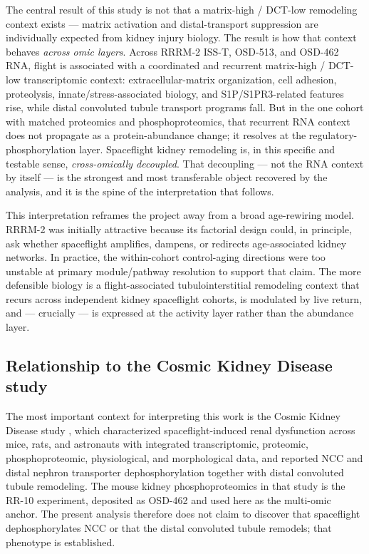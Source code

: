 \documentclass[11pt]{article}
\begin{document}
The central result of this study is not that a matrix-high / DCT-low remodeling context exists --- matrix activation and distal-transport suppression are individually expected from kidney injury biology. The result is how that context behaves \emph{across omic layers}. Across RRRM-2 ISS-T, OSD-513, and OSD-462 RNA, flight is associated with a coordinated and recurrent matrix-high / DCT-low transcriptomic context: extracellular-matrix organization, cell adhesion, proteolysis, innate/stress-associated biology, and S1P/S1PR3-related features rise, while distal convoluted tubule transport programs fall. But in the one cohort with matched proteomics and phosphoproteomics, that recurrent RNA context does not propagate as a protein-abundance change; it resolves at the regulatory-phosphorylation layer. Spaceflight kidney remodeling is, in this specific and testable sense, \emph{cross-omically decoupled}. That decoupling --- not the RNA context by itself --- is the strongest and most transferable object recovered by the analysis, and it is the spine of the interpretation that follows.

This interpretation reframes the project away from a broad age-rewiring model. RRRM-2 was initially attractive because its factorial design could, in principle, ask whether spaceflight amplifies, dampens, or redirects age-associated kidney networks. In practice, the within-cohort control-aging directions were too unstable at primary module/pathway resolution to support that claim. The more defensible biology is a flight-associated tubulointerstitial remodeling context that recurs across independent kidney spaceflight cohorts, is modulated by live return, and --- crucially --- is expressed at the activity layer rather than the abundance layer.

\subsection{Relationship to the Cosmic Kidney Disease study}

The most important context for interpreting this work is the Cosmic Kidney Disease study \citep{siew2024cosmic}, which characterized spaceflight-induced renal dysfunction across mice, rats, and astronauts with integrated transcriptomic, proteomic, phosphoproteomic, physiological, and morphological data, and reported NCC and distal nephron transporter dephosphorylation together with distal convoluted tubule remodeling. The mouse kidney phosphoproteomics in that study is the RR-10 experiment, deposited as OSD-462 and used here as the multi-omic anchor. The present analysis therefore does not claim to discover that spaceflight dephosphorylates NCC or that the distal convoluted tubule remodels; that phenotype is established.
\end{document}
